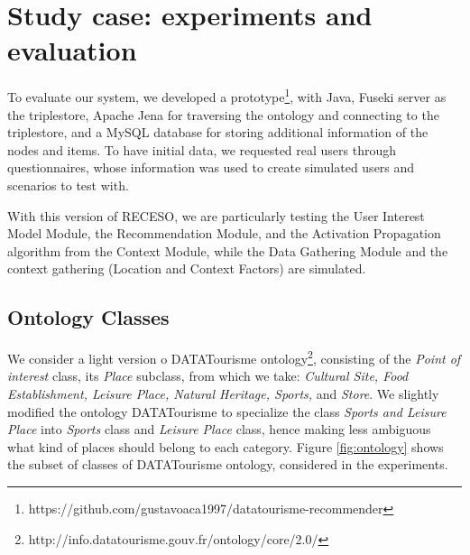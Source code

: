 \section{Study case: experiments and evaluation} \label{section:study-case}

To evaluate our system,  we developed a prototype\footnote{https://github.com/gustavoaca1997/datatourisme-recommender}, with Java, 
Fuseki server as the triplestore, Apache Jena for traversing the ontology and connecting to the triplestore, and a MySQL database for storing additional information of the nodes and items. To have initial data, we requested real users through questionnaires, whose information was used to  create simulated users and scenarios to test with.

With this version of RECESO, we are particularly testing the User Interest Model Module, the Recommendation Module, and the Activation Propagation algorithm from the Context Module, while the Data Gathering Module and the context gathering (Location and Context Factors) are simulated.


\subsection{Ontology Classes}
We consider a light version o DATATourisme ontology\footnote{http://info.datatourisme.gouv.fr/ontology/core/2.0/}, consisting of the \textit{Point of interest} class, its \textit{Place} subclass, from which we take: \textit{Cultural Site, Food Establishment, Leisure Place, Natural Heritage, Sports,} and \textit{Store}.  We slightly modified the ontology DATATourisme to specialize the class \textit{Sports and Leisure Place} into \textit{Sports} class and \textit{Leisure Place} class, hence making less ambiguous what kind of places should belong to each category. Figure \ref{fig:ontology} shows the subset of classes of DATATourisme ontology, considered  in the experiments.


